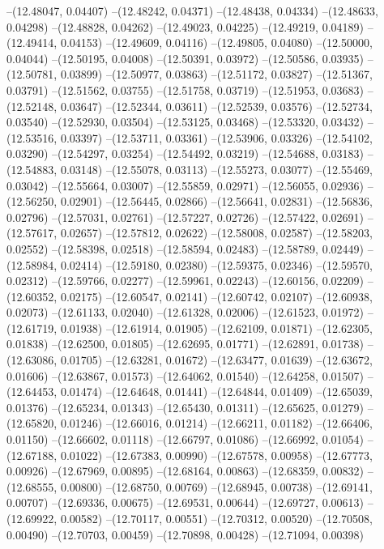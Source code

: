 --(12.48047, 0.04407)
--(12.48242, 0.04371)
--(12.48438, 0.04334)
--(12.48633, 0.04298)
--(12.48828, 0.04262)
--(12.49023, 0.04225)
--(12.49219, 0.04189)
--(12.49414, 0.04153)
--(12.49609, 0.04116)
--(12.49805, 0.04080)
--(12.50000, 0.04044)
--(12.50195, 0.04008)
--(12.50391, 0.03972)
--(12.50586, 0.03935)
--(12.50781, 0.03899)
--(12.50977, 0.03863)
--(12.51172, 0.03827)
--(12.51367, 0.03791)
--(12.51562, 0.03755)
--(12.51758, 0.03719)
--(12.51953, 0.03683)
--(12.52148, 0.03647)
--(12.52344, 0.03611)
--(12.52539, 0.03576)
--(12.52734, 0.03540)
--(12.52930, 0.03504)
--(12.53125, 0.03468)
--(12.53320, 0.03432)
--(12.53516, 0.03397)
--(12.53711, 0.03361)
--(12.53906, 0.03326)
--(12.54102, 0.03290)
--(12.54297, 0.03254)
--(12.54492, 0.03219)
--(12.54688, 0.03183)
--(12.54883, 0.03148)
--(12.55078, 0.03113)
--(12.55273, 0.03077)
--(12.55469, 0.03042)
--(12.55664, 0.03007)
--(12.55859, 0.02971)
--(12.56055, 0.02936)
--(12.56250, 0.02901)
--(12.56445, 0.02866)
--(12.56641, 0.02831)
--(12.56836, 0.02796)
--(12.57031, 0.02761)
--(12.57227, 0.02726)
--(12.57422, 0.02691)
--(12.57617, 0.02657)
--(12.57812, 0.02622)
--(12.58008, 0.02587)
--(12.58203, 0.02552)
--(12.58398, 0.02518)
--(12.58594, 0.02483)
--(12.58789, 0.02449)
--(12.58984, 0.02414)
--(12.59180, 0.02380)
--(12.59375, 0.02346)
--(12.59570, 0.02312)
--(12.59766, 0.02277)
--(12.59961, 0.02243)
--(12.60156, 0.02209)
--(12.60352, 0.02175)
--(12.60547, 0.02141)
--(12.60742, 0.02107)
--(12.60938, 0.02073)
--(12.61133, 0.02040)
--(12.61328, 0.02006)
--(12.61523, 0.01972)
--(12.61719, 0.01938)
--(12.61914, 0.01905)
--(12.62109, 0.01871)
--(12.62305, 0.01838)
--(12.62500, 0.01805)
--(12.62695, 0.01771)
--(12.62891, 0.01738)
--(12.63086, 0.01705)
--(12.63281, 0.01672)
--(12.63477, 0.01639)
--(12.63672, 0.01606)
--(12.63867, 0.01573)
--(12.64062, 0.01540)
--(12.64258, 0.01507)
--(12.64453, 0.01474)
--(12.64648, 0.01441)
--(12.64844, 0.01409)
--(12.65039, 0.01376)
--(12.65234, 0.01343)
--(12.65430, 0.01311)
--(12.65625, 0.01279)
--(12.65820, 0.01246)
--(12.66016, 0.01214)
--(12.66211, 0.01182)
--(12.66406, 0.01150)
--(12.66602, 0.01118)
--(12.66797, 0.01086)
--(12.66992, 0.01054)
--(12.67188, 0.01022)
--(12.67383, 0.00990)
--(12.67578, 0.00958)
--(12.67773, 0.00926)
--(12.67969, 0.00895)
--(12.68164, 0.00863)
--(12.68359, 0.00832)
--(12.68555, 0.00800)
--(12.68750, 0.00769)
--(12.68945, 0.00738)
--(12.69141, 0.00707)
--(12.69336, 0.00675)
--(12.69531, 0.00644)
--(12.69727, 0.00613)
--(12.69922, 0.00582)
--(12.70117, 0.00551)
--(12.70312, 0.00520)
--(12.70508, 0.00490)
--(12.70703, 0.00459)
--(12.70898, 0.00428)
--(12.71094, 0.00398)

